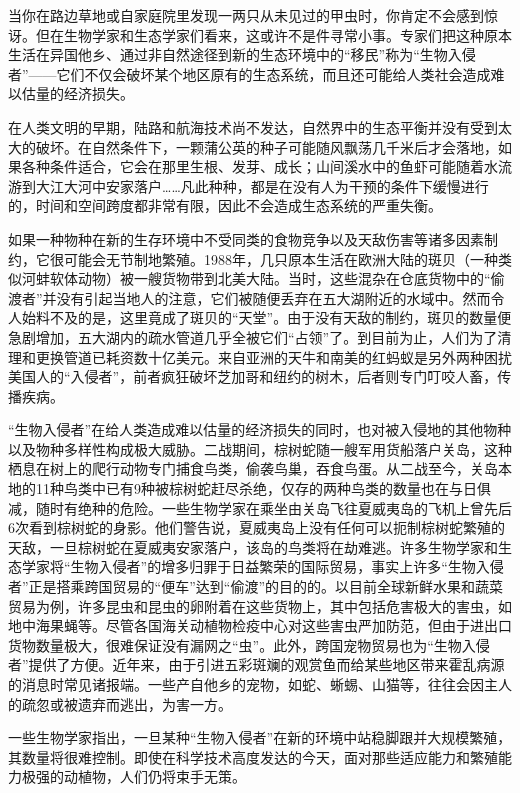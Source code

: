 \documentclass[12pt,UTF-8,openany]{ctexbook}
\begin{document}
\begin{normalsize}
    
    当你在路边草地或自家庭院里发现一两只从未见过的甲虫时，你肯定不会感到惊讶。但在生物学家和生态学家们看来，这或许不是件寻常小事。专家们把这种原本生活在异国他乡、通过非自然途径到新的生态环境中的“移民”称为“生物入侵者”——它们不仅会破坏某个地区原有的生态系统，而且还可能给人类社会造成难以估量的经济损失。
    
    在人类文明的早期，陆路和航海技术尚不发达，自然界中的生态平衡并没有受到太大的破坏。在自然条件下，一颗蒲公英的种子可能随风飘荡几千米后才会落地，如果各种条件适合，它会在那里生根、发芽、成长；山间溪水中的鱼虾可能随着水流游到大江大河中安家落户……凡此种种，都是在没有人为干预的条件下缓慢进行的，时间和空间跨度都非常有限，因此不会造成生态系统的严重失衡。
    
    如果一种物种在新的生存环境中不受同类的食物竞争以及天敌伤害等诸多因素制约，它很可能会无节制地繁殖。1988年，几只原本生活在欧洲大陆的斑贝（一种类似河蚌软体动物）被一艘货物带到北美大陆。当时，这些混杂在仓底货物中的“偷渡者”并没有引起当地人的注意，它们被随便丢弃在五大湖附近的水域中。然而令人始料不及的是，这里竟成了斑贝的“天堂”。由于没有天敌的制约，斑贝的数量便急剧增加，五大湖内的疏水管道几乎全被它们“占领”了。到目前为止，人们为了清理和更换管道已耗资数十亿美元。来自亚洲的天牛和南美的红蚂蚁是另外两种困扰美国人的“入侵者”，前者疯狂破坏芝加哥和纽约的树木，后者则专门叮咬人畜，传播疾病。
    
    “生物入侵者”在给人类造成难以估量的经济损失的同时，也对被入侵地的其他物种以及物种多样性构成极大威胁。二战期间，棕树蛇随一艘军用货船落户关岛，这种栖息在树上的爬行动物专门捕食鸟类，偷袭鸟巢，吞食鸟蛋。从二战至今，关岛本地的11种鸟类中已有9种被棕树蛇赶尽杀绝，仅存的两种鸟类的数量也在与日俱减，随时有绝种的危险。一些生物学家在乘坐由关岛飞往夏威夷岛的飞机上曾先后6次看到棕树蛇的身影。他们警告说，夏威夷岛上没有任何可以扼制棕树蛇繁殖的天敌，一旦棕树蛇在夏威夷安家落户，该岛的鸟类将在劫难逃。许多生物学家和生态学家将“生物入侵者”的增多归罪于日益繁荣的国际贸易，事实上许多“生物入侵者”正是搭乘跨国贸易的“便车”达到“偷渡”的目的的。以目前全球新鲜水果和蔬菜贸易为例，许多昆虫和昆虫的卵附着在这些货物上，其中包括危害极大的害虫，如地中海果蝇等。尽管各国海关动植物检疫中心对这些害虫严加防范，但由于进出口货物数量极大，很难保证没有漏网之“虫”。此外，跨国宠物贸易也为“生物入侵者”提供了方便。近年来，由于引进五彩斑斓的观赏鱼而给某些地区带来霍乱病源的消息时常见诸报端。一些产自他乡的宠物，如蛇、蜥蜴、山猫等，往往会因主人的疏忽或被遗弃而逃出，为害一方。
    
    一些生物学家指出，一旦某种“生物入侵者”在新的环境中站稳脚跟并大规模繁殖，其数量将很难控制。即使在科学技术高度发达的今天，面对那些适应能力和繁殖能力极强的动植物，人们仍将束手无策。
    

\end{normalsize}
\end{document}
